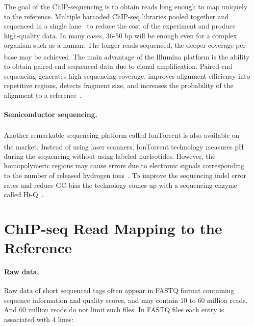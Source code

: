 The goal of the ChIP-sequencing is to obtain reads long enough to map uniquely to the reference. 
Multiple barcoded ChIP-seq libraries pooled together and sequenced in a single lane~\cite{craig2008identification} to reduce the cost of the experiment and produce high-quality data.
In many cases, 36-50 bp will be enough even for a complex organism such as a human. 
The longer reads sequenced, the deeper coverage per base may be achieved.
The main advantage of the Illumina\textsuperscript{\texttrademark} platform is the ability to obtain paired-end sequenced data due to clonal amplification. 
Paired-end sequencing generates high sequencing coverage, improves alignment efficiency into repetitive regions, detects fragment size, and increases the probability of the alignment to a reference~\cite{kidder2011chip, chen2012systematic}.



\paragraph{Semiconductor sequencing.}
Another remarkable sequencing platform called IonTorrent\textsuperscript{\texttrademark} is also available on the market. 
Instead of using laser scanners, IonTorrent\textsuperscript{\texttrademark} technology measures pH during the sequencing without using labeled nucleotides. 
However, the homopolymeric regions may cause errors due to electronic signals corresponding to the number of released hydrogen ions~\cite{ambardar2016high}.
To improve the sequencing indel error rates and reduce GC-bias the technology comes up with a sequencing enzyme called Hi-Q~\cite{veras2014efficiency}. 










\section{ChIP-seq Read Mapping to the Reference}

\paragraph{Raw data.}
Raw data of short sequenced tags often appear in FASTQ format containing sequence information and quality scores, and may contain 10 to 60 million reads. 
And 60 million reads do not limit such files. 
In FASTQ files each entry is associated with 4 lines:


